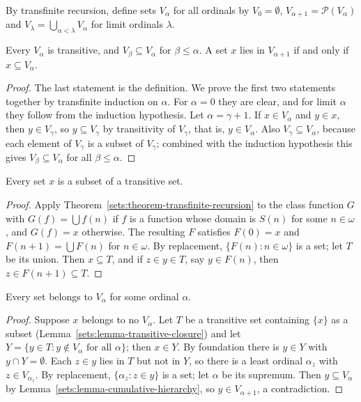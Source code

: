 \begin{definition}\label{sets:definition-cumulative-hierarchy}
By transfinite recursion, define sets $V_\alpha$ for all ordinals by
$V_0 = \emptyset$, $V_{\alpha + 1} = \mathcal{P}(V_\alpha)$ and
$V_\lambda = \bigcup_{\alpha < \lambda} V_\alpha$ for limit ordinals $\lambda$.
\end{definition}

\begin{lemma}\label{sets:lemma-cumulative-hierarchy}
Every $V_\alpha$ is transitive, and $V_\beta \subseteq V_\alpha$ for
$\beta \leq \alpha$. A set $x$ lies in $V_{\alpha + 1}$ if and only if
$x \subseteq V_\alpha$.
\end{lemma}

\begin{proof}
The last statement is the definition. We prove the first two statements
together by transfinite induction on $\alpha$. For $\alpha = 0$ they are
clear, and for limit $\alpha$ they follow from the induction hypothesis. Let
$\alpha = \gamma + 1$. If $x \in V_\alpha$ and $y \in x$, then $y \in V_\gamma$,
so $y \subseteq V_\gamma$ by transitivity of $V_\gamma$, that is,
$y \in V_\alpha$. Also $V_\gamma \subseteq V_\alpha$, because each element of
$V_\gamma$ is a subset of $V_\gamma$; combined with the induction hypothesis
this gives $V_\beta \subseteq V_\alpha$ for all $\beta \leq \alpha$.
\end{proof}

\begin{lemma}\label{sets:lemma-transitive-closure}
Every set $x$ is a subset of a transitive set.
\end{lemma}

\begin{proof}
Apply Theorem~\ref{sets:theorem-transfinite-recursion} to the class function
$G$ with $G(f) = \bigcup f(n)$ if $f$ is a function whose domain is $S(n)$ for
some $n \in \omega$, and $G(f) = x$ otherwise. The resulting $F$ satisfies
$F(0) = x$ and $F(n + 1) = \bigcup F(n)$ for $n \in \omega$. By replacement,
$\{F(n) : n \in \omega\}$ is a set; let $T$ be its union. Then $x \subseteq T$,
and if $z \in y \in T$, say $y \in F(n)$, then $z \in F(n+1) \subseteq T$.
\end{proof}

\begin{theorem}\label{sets:theorem-every-set-ranked}
Every set belongs to $V_\alpha$ for some ordinal $\alpha$.
\end{theorem}

\begin{proof}
Suppose $x$ belongs to no $V_\alpha$. Let $T$ be a transitive set containing
$\{x\}$ as a subset (Lemma~\ref{sets:lemma-transitive-closure}) and let
$Y = \{y \in T : y \notin V_\alpha \text{ for all } \alpha\}$; then $x \in Y$. By
foundation there is $y \in Y$ with $y \cap Y = \emptyset$. Each $z \in y$ lies in
$T$ but not in $Y$, so there is a least ordinal $\alpha_z$ with
$z \in V_{\alpha_z}$. By replacement, $\{\alpha_z : z \in y\}$ is a set; let
$\alpha$ be its supremum. Then $y \subseteq V_\alpha$ by
Lemma~\ref{sets:lemma-cumulative-hierarchy}, so $y \in V_{\alpha + 1}$, a
contradiction.
\end{proof}


